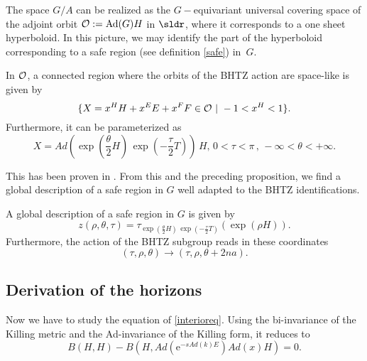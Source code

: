 The space $G/A$ can be realized as the $G-$equivariant universal covering space of the adjoint orbit ${\cal O}:= \mbox{Ad}(G)H$ in $\sldr$, where it corresponds to a one sheet hyperboloid. In this picture, we may identify the part of the hyperboloid corresponding to a safe region (see definition \ref{safe}) in~$G$.

\begin{lemma}
In ${\cal O}$, a connected region where the orbits of the BHTZ action are space-like is given by
\begin{equation}
 \{ X = x^H H+x^E E + x^F F \in {\cal O} \,\, | \,\, -1 < x^H <
 1\}.
\end{equation}
Furthermore, it can be parameterized as
\begin{equation}
 X = Ad\left(\exp(\frac{\theta}{2}H) \, \exp(-\frac{\tau}{2}
 T)\right)\, H, \, 0<\tau<\pi \, ,\,  -\infty<\theta<+\infty
 .
\end{equation}
\end{lemma}
This has been proven in \cite{BTZB_un}. From this and the preceding proposition, we find a global description of a safe region in $G$ well adapted to the BHTZ identifications.

\begin{proposition}
A global description of a safe region in $G$ is given by
\begin{equation}\label{CoordGlob}
 z(\rho,\theta,\tau) =
\tau_{\exp(\frac{\theta}{2}H) \,
 \exp(-\frac{\tau}{2}
 T)}(\exp(\rho H)).
 \end{equation}
 Furthermore, the action of the BHTZ subgroup reads in these coordinates
\begin{equation}
 (\tau , \rho, \theta) \rightarrow (\tau, \rho, \theta + 2 n
a).
\end{equation}
\end{proposition}


\subsection{Derivation of the horizons}

Now we have to study the equation of \eqref{interioreq}. Using the bi-invariance of the Killing metric and the Ad-invariance of the Killing form, it reduces to
\begin{equation}\label{EqHoriz}
B(H,H) - B(H,Ad(\mbox{e}^{-s Ad(k)E}) Ad(x) H) = 0.
\end{equation}

